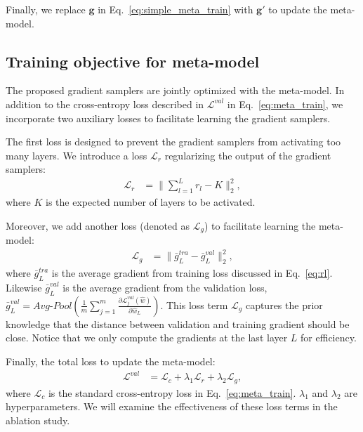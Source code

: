 \documentclass[final]{cvpr}
\begin{document}
Finally, we replace $\mathbf{g}$ in Eq.~\eqref{eq:simple_meta_train} with  $\mathbf{g}'$ to update the meta-model. 



\subsection{Training objective for meta-model}\label{sec:overall_objective}
The proposed gradient samplers are jointly optimized with the meta-model. In addition to the cross-entropy loss described in $\mathcal{L}^{val}$ in Eq.~\eqref{eq:meta_train}, we incorporate two auxiliary losses to facilitate learning the gradient samplers.

The first loss is designed to prevent the gradient samplers from activating too many layers. We introduce a loss $\mathcal{L}_{r}$ regularizing the output of the gradient samplers:
\begin{align}
\label{eq:l_r}
    \mathcal{L}_{r} &= \|\sum_{l=1}^L {r_l} - K\|_2^{2},
\end{align}
where $K$ is the expected number of layers to be activated. 

Moreover, we add another loss (denoted as $\mathcal{L}_{g}$) to facilitate learning the meta-model:
\begin{align}
    \mathcal{L}_{g} &= \|\bar{g}_{L}^{tra} - \bar{g}_{L}^{val}\|_2^{2},
\end{align}
where $\bar{g}_{L}^{tra}$ is the average gradient from training loss discussed in Eq.~\eqref{eq:rl}. Likewise $\bar{g}_{L}^{val}$ is the average gradient from the validation loss, \ie $\bar{g}_{L}^{val}= \textit{Avg-Pool}(\frac{1}{m}\sum_{j=1}^{m}\frac{\partial \mathcal{L}_j^{val}(\hat{w})}{\partial\hat{w}_L})$. This loss term $\mathcal{L}_{g}$ captures the prior knowledge that the distance between validation and training gradient should be close. Notice that we only compute the gradients at the last layer $L$ for efficiency.


Finally, the total loss to update the meta-model:
\begin{align}
\label{eq:final_loss}
    \mathcal{L}^{val} &= \mathcal{L}_{c} + \lambda_1 \mathcal{L}_{r} + \lambda_2 \mathcal{L}_{g},
\end{align}
where $\mathcal{L}_{c}$ is the standard cross-entropy loss in Eq.~\eqref{eq:meta_train}. 
$\lambda_1$ and $\lambda_2$ are hyperparameters. We will examine the effectiveness of these loss terms in the ablation study.

 
\end{document}

